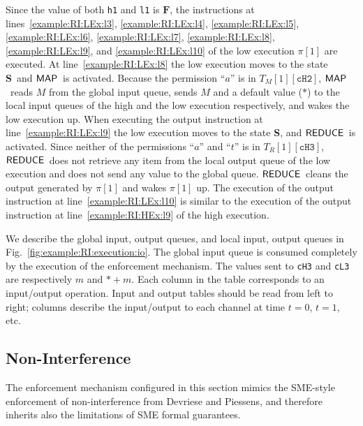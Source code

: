 \documentclass[10pt,a4paper,oneside]{article}
\def\sS{\textbf{S}}
\def\TAV{\ensuremath{T_{M}}}
\def\TPV{\ensuremath{T_{R}}}
\def\VFALSE{\ensuremath{\textbf{F}}}
\def\sanserif#1{\ensuremath{\sf #1}}
\def\REDUCE{\ensuremath{\sanserif{REDUCE}}}
\def\MAP{\ensuremath{\sanserif{MAP}}}
\def\Prog{\ensuremath{\pi}}
\def\Progl#1{\ensuremath{\Prog[#1]}}
\def\task{\ensuremath{a}}
\def\ttell{\ensuremath{t}}
\def\linecode#1{{\texttt{#1}}}
\begin{document}
Since the value of both \linecode{h1} and \linecode{l1} is \VFALSE, the instructions at lines~\ref{example:RI:LEx:l3}, \ref{example:RI:LEx:l4}, \ref{example:RI:LEx:l5}, \ref{example:RI:LEx:l6}, \ref{example:RI:LEx:l7}, \ref{example:RI:LEx:l8}, \ref{example:RI:LEx:l9}, and \ref{example:RI:LEx:l10} of the low execution \Progl{1} are executed. At line~\ref{example:RI:LEx:l8} the low execution moves to the state \sS\ and \MAP\ is activated. Because the permission ``$\task$'' is in $\TAV[1][\linecode{cH2}]$, \MAP\ reads $M$ from the global input queue, sends $M$ and a default value ($*$) to the local input queues of the high and the low execution respectively, and wakes the low execution up. When executing the output instruction at line~\ref{example:RI:LEx:l9} the low execution moves to the state \sS, and \REDUCE\ is activated. Since neither of the permissions ``$\task$'' and ``$\ttell$'' is in $\TPV[1][\linecode{cH3}]$, \REDUCE\ does not retrieve any item from the local output queue of the low execution and does not send any value to the global queue. \REDUCE\ cleans the output generated by \Progl{1} and wakes \Progl{1} up. The execution of the output instruction at line~\ref{example:RI:LEx:l10} is similar to the execution of the output instruction at line~\ref{example:RI:HEx:l9} of the high execution.

We describe the global input, output queues, and local input, output queues in Fig.~\ref{fig:example:RI:execution:io}. The global input queue is consumed completely by the execution of the enforcement mechanism. The values sent to \linecode{cH3} and \linecode{cL3} are respectively $m$ and $* + m$. Each column in the table corresponds to an input/output operation. Input and output tables should be read from left to right; columns describe the input/output to each channel at time $t = 0$, $t = 1$, etc.




\subsection{Non-Interference}\label{sec:em:NI}
The enforcement mechanism configured in this section mimics the SME-style enforcement of non-interference \cite{Devr-Pies-10-IEEESP} from Devriese and Piessens, and therefore inherits also the limitations of SME formal guarantees.
\end{document}
